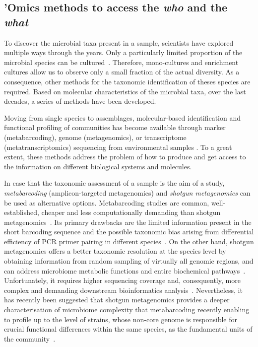    \subsection{'Omics methods to access the \textit{who} and the \textit{what}}
   \label{subsec:omics}
      To discover the microbial taxa present in a sample, scientists have 
      explored multiple ways through the years. 
      Only a particularly limited proportion of the microbial species 
      can be cultured~\cite{steen2019high}.
      Therefore, mono-cultures and enrichment cultures allow us to observe 
      only a small fraction of the actual diversity. 
      As a consequence, other methods for the taxonomic identification of theses
      species are required.
      Based on molecular characteristics of the microbial taxa, 
      over the last decades, a series of methods have been developed. 
 
      Moving from single species to assemblages, molecular-based identification and functional 
      profiling of communities has become available through marker (metabarcoding), 
      genome (metagenomics), or transcriptome (metatranscriptomics) sequencing from environmental 
      samples \citep{goldford2018emergent}. 
      To a great extent, these methods address the problem of how to produce and get access 
      to the information on different biological systems and molecules.

      In case that the taxonomic assessment of a sample is the aim of a study, 
      \textit{metabarcoding} (amplicon-targeted metagenomics) and \textit{shotgun metagenomics} can be used as alternative options. 
      Metabarcoding studies are common, well-established, cheaper and less computationally demanding than shotgun metagenomics~\cite{bell2021comparing}. 
      Its primary drawbacks are the limited information present in the short barcoding sequence and the possible taxonomic bias arising from differential efficiency of PCR primer pairing in different species~\cite{blazewicz2013evaluating}. 
      On the other hand, shotgun metagenomics offers a better taxonomic resolution at the species level by obtaining information from random sampling of virtually all genomic regions, and can address microbiome metabolic functions and entire biochemical pathways~\cite{sharpton2014introduction}. 
      Unfortunately, it requires higher sequencing coverage and, consequently, more complex and demanding downstream bioinformatics analysis~\cite{laudadio2018quantitative}. 
      Nevertheless, it has recently been suggested that shotgun metagenomics provides a deeper characterisation of microbiome complexity that metabarcoding recently enabling to profile up to the level of strains, whose non-core genome is responsible for crucial functional differences within the same species, as the fundamental units of the community~\cite{davila2019review, clooney2016comparing, segata2018road}.       
      
